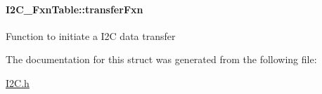 \paragraph[{transfer\-Fxn}]{ I2\-C\-\_\-\-Fxn\-Table\-::transfer\-Fxn}\label{struct_i2_c___fxn_table_a16048b22814e3d123f82a7674599b15c}
Function to initiate a I2\-C data transfer 

The documentation for this struct was generated from the following file\-:\begin{DoxyCompactItemize}
\item 
\hyperlink{_i2_c_8h}{I2\-C.\-h}\end{DoxyCompactItemize}
